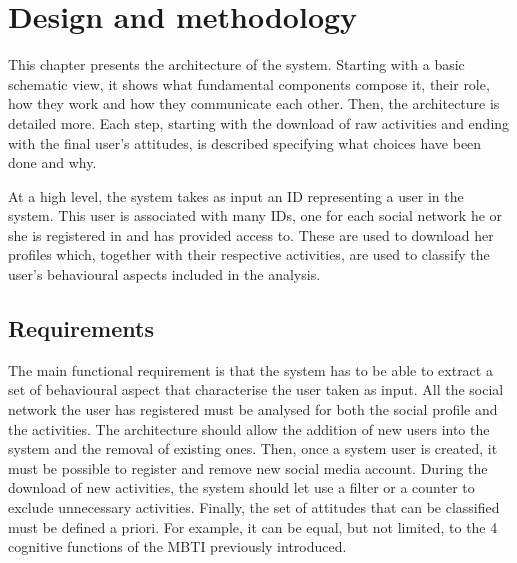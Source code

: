 \chapter{Design and methodology}
This chapter presents the architecture of the system. Starting with a basic schematic view, it shows what fundamental components compose it, their role, how they work and how they communicate each other.
Then, the architecture is detailed more. Each step, starting with the download of raw activities and ending with the final user's attitudes, is described specifying what choices have been done and why.

At a high level, the system takes as input an ID representing a user in the system.
This user is associated with many IDs, one for each social network he or she is registered in and has provided access to.
These are used to download her profiles which, together with their respective activities, are used to classify the user's behavioural aspects included in the analysis.

\section{Requirements}
The main functional requirement is that the system has to be able to extract a set of behavioural aspect that characterise the user taken as input.
All the social network the user has registered must be analysed for both the social profile and the activities.
The architecture should allow the addition of new users into the system and the removal of existing ones. Then, once a system user is created, it must be possible to register and remove new social media account.
During the download of new activities, the system should let use a filter or a counter to exclude unnecessary activities.
Finally, the set of attitudes that can be classified must be defined a priori. For example, it can be equal, but not limited, to the 4 cognitive functions of the MBTI previously introduced.

